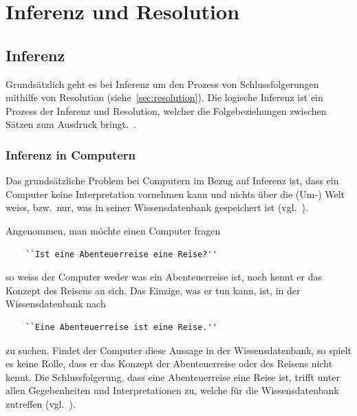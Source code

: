 \chapter{Inferenz und Resolution}
\label{chap:inferenz_resolution}

\section{Inferenz}
\label{sec:inferenz}
Grundsätzlich geht es bei Inferenz um den Prozess von Schlussfolgerungen mithilfe von Resolution (siehe~\ref{sec:resolution}). Die logische Inferenz ist ein Prozess der Inferenz und Resolution, welcher die Folgebeziehungen zwischen Sätzen zum Ausdruck bringt.~\cite[S. 163]{russel}.

\subsection{Inferenz in Computern}
\label{subsec:inferenz-in-computer}

Das grundsätzliche Problem bei Computern im Bezug auf Inferenz ist, dass ein Computer keine Interpretation vornehmen kann und nichts über die (Um-) Welt weiss, bzw.\ nur, was in seiner Wissensdatenbank gespeichert ist (vgl.~\citet[S. 164]{russel}).


Angenommen, man möchte einen Computer fragen

\begin{lstlisting}
    ``Ist eine Abenteuerreise eine Reise?''
\end{lstlisting}

so weiss der Computer weder was ein Abenteuerreise ist, noch kennt er das Konzept des Reisens an sich. Das Einzige, was er tun kann, ist, in der Wissensdatenbank nach 

\begin{lstlisting}
    ``Eine Abenteuerreise ist eine Reise.''
\end{lstlisting}

zu suchen. Findet der Computer diese Aussage in der Wissensdatenbank, so spielt es keine Rolle, dass er das Konzept der Abenteuerreise oder des Reisens nicht kennt. Die Schlussfolgerung, dass eine Abenteuerreise eine Reise ist, trifft unter allen Gegebenheiten und Interpretationen zu, welche für die Wissensdatenbank zutreffen (vgl.~\cite[S.164]{russel}).

